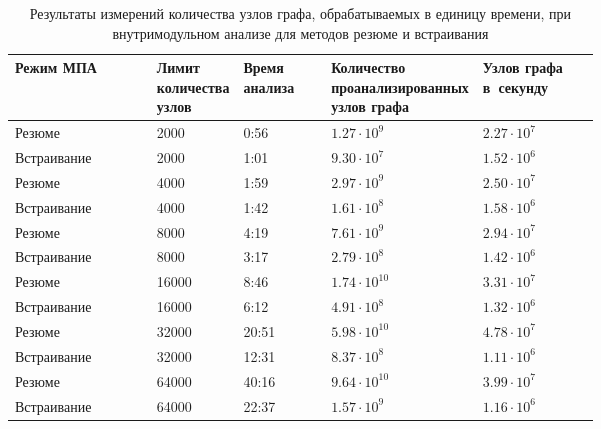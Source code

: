 \begin{table}
\renewcommand{\arraystretch}{1.2}
\begin{tabular}{| l | p{0.13\linewidth} | p{0.15\linewidth} | p{0.2\linewidth} || p{0.2\linewidth} |}
\hline
Режим МПА & Лимит количества узлов & Время анализа & Количество проанализированных узлов графа & Узлов графа в~секунду \\
\hline
\hline
Резюме      & 2000      &   0:56       & $1.27 \cdot 10^{9}$  & $2.27 \cdot 10^7$ \\
Встраивание & 2000      &   1:01       & $9.30 \cdot 10^{7}$  & $1.52 \cdot 10^6$ \\
\hline
Резюме      & 4000      &   1:59       & $2.97 \cdot 10^{9}$  & $2.50 \cdot 10^7$ \\
Встраивание & 4000      &   1:42       & $1.61 \cdot 10^{8}$  & $1.58 \cdot 10^6$ \\
\hline
Резюме      & 8000      &   4:19       & $7.61 \cdot 10^{9}$  & $2.94 \cdot 10^7$ \\
Встраивание & 8000      &   3:17       & $2.79 \cdot 10^{8}$  & $1.42 \cdot 10^6$ \\
\hline
Резюме      & 16000      &  8:46       & $1.74 \cdot 10^{10}$ & $3.31 \cdot 10^7$ \\
Встраивание & 16000      &  6:12       & $4.91 \cdot 10^{8}$  & $1.32 \cdot 10^6$ \\
\hline
Резюме      & 32000      &  20:51      & $5.98 \cdot 10^{10}$ & $4.78 \cdot 10^7$ \\
Встраивание & 32000      &  12:31      & $8.37 \cdot 10^{8}$  & $1.11 \cdot 10^6$ \\
\hline
Резюме      & 64000      &  40:16      & $9.64 \cdot 10^{10}$ & $3.99 \cdot 10^7$ \\
Встраивание & 64000      &  22:37      & $1.57 \cdot 10^{9}$  & $1.16 \cdot 10^6$ \\
\hline
\hline

\end{tabular}
\caption{Результаты измерений количества узлов графа, обрабатываемых в единицу времени, при внутримодульном анализе для методов резюме и встраивания} \label{table:time-number}
\end{table}
